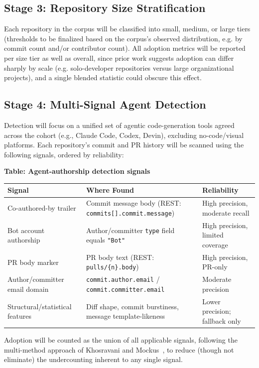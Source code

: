 \documentclass[11pt,a4paper]{article}
\begin{document}
\subsection{Stage 3: Repository Size Stratification}
Each repository in the corpus will be classified into small, medium, or large tiers (thresholds to be finalized based on the corpus's observed distribution, e.g. by commit count and/or contributor count). All adoption metrics will be reported per size tier as well as overall, since prior work suggests adoption can differ sharply by scale (e.g. solo-developer repositories versus large organizational projects), and a single blended statistic could obscure this effect.

\subsection{Stage 4: Multi-Signal Agent Detection}
Detection will focus on a unified set of agentic code-generation tools agreed across the cohort (e.g., Claude Code, Codex, Devin), excluding no-code/visual platforms. Each repository's commit and PR history will be scanned using the following signals, ordered by reliability:

\begin{center}
\textbf{Table: Agent-authorship detection signals}\\[4pt]
\begin{tabularx}{\textwidth}{@{}p{3.2cm}Xl@{}}
\toprule
\textbf{Signal} & \textbf{Where Found} & \textbf{Reliability} \\
\midrule
Co-authored-by trailer & Commit message body (REST: \texttt{commits[].commit.message}) & High precision, moderate recall \\
Bot account authorship & Author/committer \texttt{type} field equals \texttt{"Bot"} & High precision, limited coverage \\
PR body marker & PR body text (REST: \texttt{pulls/\{n\}.body}) & High precision, PR-only \\
Author/committer email domain & \texttt{commit.author.email} / \texttt{commit.committer.email} & Moderate precision \\
Structural/statistical features & Diff shape, commit burstiness, message template-likeness & Lower precision; fallback only \\
\bottomrule
\end{tabularx}
\end{center}

Adoption will be counted as the union of all applicable signals, following the multi-method approach of Khosravani and Mockus~\cite{khosravani2026detecting}, to reduce (though not eliminate) the undercounting inherent to any single signal.
\end{document}
